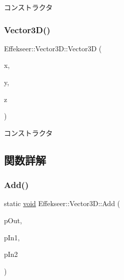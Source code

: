 コンストラクタ 

\mbox{\label{struct_effekseer_1_1_vector3_d_a304fedc7d4d4140d9e0930f1e9785393}} 
\subsubsection{\texorpdfstring{Vector3\+D()}{Vector3D()}\hspace{0.1cm}{\footnotesize\ttfamily [2/2]}}
{\footnotesize\ttfamily Effekseer\+::\+Vector3\+D\+::\+Vector3D (\begin{DoxyParamCaption}\item[{float}]{x,  }\item[{float}]{y,  }\item[{float}]{z }\end{DoxyParamCaption})}



コンストラクタ 



\subsection{関数詳解}
\mbox{\label{struct_effekseer_1_1_vector3_d_a79225e27a6ca17af79e5eca70ff44cb0}} 
\subsubsection{\texorpdfstring{Add()}{Add()}}
{\footnotesize\ttfamily static \mbox{\hyperlink{namespace_effekseer_ab34c4088e512200cf4c2716f168deb56}{void}} Effekseer\+::\+Vector3\+D\+::\+Add (\begin{DoxyParamCaption}\item[{\mbox{\hyperlink{struct_effekseer_1_1_vector3_d}{Vector3D}} $\ast$}]{p\+Out,  }\item[{const \mbox{\hyperlink{struct_effekseer_1_1_vector3_d}{Vector3D}} $\ast$}]{p\+In1,  }\item[{const \mbox{\hyperlink{struct_effekseer_1_1_vector3_d}{Vector3D}} $\ast$}]{p\+In2 }\end{DoxyParamCaption})\hspace{0.3cm}{\ttfamily [static]}}



